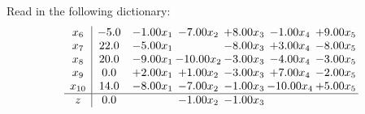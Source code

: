 \documentclass[9pt]{article}
\begin{document}
Read in the following dictionary:
\[\begin{array}{c| c c@{\hskip 2pt} c@{\hskip 2pt} c@{\hskip 2pt} c@{\hskip 2pt} c@{\hskip 2pt} }
 x_{6}   &  -5.0 & -1.00 x_{1} & -7.00 x_{2} & +  8.00 x_{3} & -1.00 x_{4} & +  9.00 x_{5}\\
 x_{7}   &  22.0 & -5.00 x_{1} &   & -8.00 x_{3} & +  3.00 x_{4} & -8.00 x_{5}\\
 x_{8}   &  20.0 & -9.00 x_{1} & -10.00 x_{2} & -3.00 x_{3} & -4.00 x_{4} & -3.00 x_{5}\\
 x_{9}   &  0.0 & +  2.00 x_{1} & +  1.00 x_{2} & -3.00 x_{3} & +  7.00 x_{4} & -2.00 x_{5}\\
 x_{10}   &  14.0 & -8.00 x_{1} & -7.00 x_{2} & -1.00 x_{3} & -10.00 x_{4} & +  5.00 x_{5}\\
\hline
z    &  0.0  &   & -1.00 x_{2} & -1.00 x_{3} &    &   \\
\end{array}\]
\end{document}
